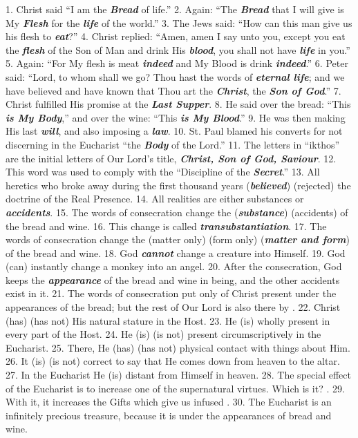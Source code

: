 \documentclass[a5paper]{article}
\newcommand\answer[1]{\textbf{\textit{#1}}}
\begin{document}
1. Christ said ``I am the \answer{Bread} of life.'' 2. Again: ``The \answer{Bread}  that  I
will give is My \answer{Flesh} for the \answer{life} of the world.'' 3. The  Jews  said:
``How can this man give us his flesh to \answer{eat}?'' 4. Christ replied:  ``Amen,
amen I say unto you, except you eat the \answer{flesh}  of  the  Son  of  Man  and
drink His \answer{blood}, you shall not have \answer{life} in you.'' 5.  Again:  ``For  My
flesh is meat \answer{indeed} and My Blood  is  drink  \answer{indeed}.''  6.  Peter  said:
“Lord, to whom shall we go? Thou hast the words of  \answer{eternal life};  and  we  have
believed and have known that  Thou  art  the  \answer{Christ},  the  \answer{Son of God}.”  7.
Christ fulfilled His promise at the \answer{Last Supper}. 8. He  said  over  the  bread:
“This \answer{is My Body},” and over the wine: “This \answer{is My Blood}.” 9. He was  then  making
His last \answer{will}, and also imposing a \answer{law}. 10.  St.  Paul  blamed  his
converts for not discerning in the Eucharist “the  \answer{Body}  of  the  Lord.”
11. The letters in “ikthos” are the initial letters  of  Our  Lord's  title,
\answer{Christ, Son of God, Saviour}. 12. This word was used to  comply  with  the  ``Discipline  of  the
\answer{Secret}.'' 13. All heretics who broke away during the  first  thousand  years
(\answer{believed}) (rejected) the doctrine of the Real Presence. 14.  All  realities
are either substances or \answer{accidents}. 15. The words of consecration change  the
(\answer{substance}) (accidents) of the bread and wine. 16.  This  change  is  called
\answer{transubstantiation}. 17. The words of  consecration  change  the  (matter  only)  (form
only) (\answer{matter and form}) of the  bread  and  wine.  18.  God  \answer{cannot}
change a creature into Himself. 19. God (can) \answer{}  instantly  change  a
monkey into an angel. 20. After the consecration, God keeps the \answer{appearance}  of
the bread and wine in being, and the other accidents exist in  it.  21.  The
words of  consecration  put  only  \answer{}  of  Christ  present  under  the
appearances of the bread; but  the  rest  of  Our  Lord  is  also  there  by
\answer{}. 22. Christ (has) (has not) His natural stature in  the  Host.  23.
He (is) \answer{} wholly present in every part of the Host. 24. He  (is)  (is
not) present circumscriptively in the Eucharist. 25. There,  He  (has)  (has
not) physical contact with things about Him. 26. It (is)  (is  not)  correct
to say that He comes down from heaven to the altar. 27. In the Eucharist  He
(is) \answer{} distant from Himself in heaven. 28. The special effect of  the
Eucharist is to increase one of  the  supernatural  virtues.  Which  is  it?
\answer{}. 29. With  it,  it  increases  the  Gifts  which  give  us  infused
\answer{}. 30. The Eucharist is an infinitely precious treasure,  because  it
is \answer{} under the appearances of bread and wine.
\end{document}
